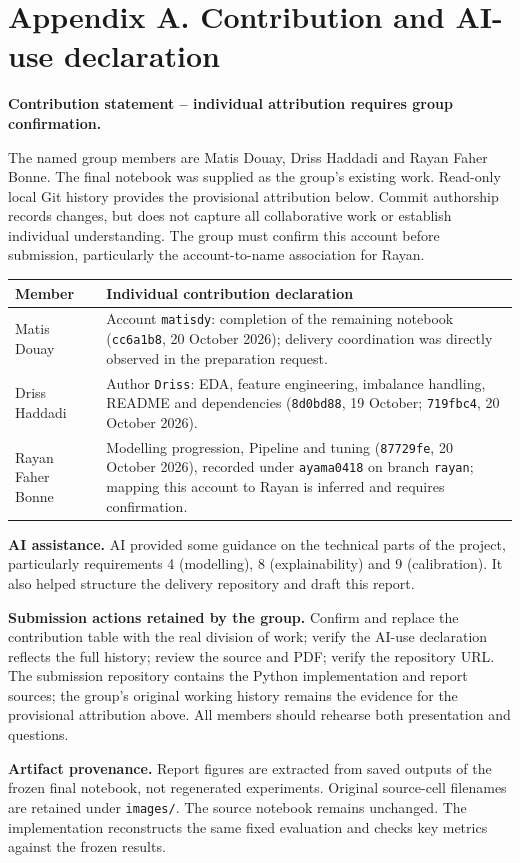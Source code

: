 \documentclass[11pt,a4paper]{article}
\newcommand{\nextpage}{\clearpage}
\begin{document}
\nextpage
\appendix
\section*{Appendix A. Contribution and AI-use declaration}
\textbf{Contribution statement -- individual attribution requires group confirmation.}

The named group members are Matis Douay, Driss Haddadi and Rayan Faher Bonne. The final notebook was supplied as the group's existing work. Read-only local Git history provides the provisional attribution below. Commit authorship records changes, but does not capture all collaborative work or establish individual understanding. The group must confirm this account before submission, particularly the account-to-name association for Rayan.

\begin{center}\begin{tabularx}{\linewidth}{lX}\toprule
Member & Individual contribution declaration\\\midrule
Matis Douay & Account \texttt{matisdy}: completion of the remaining notebook (\texttt{cc6a1b8}, 20 October 2026); delivery coordination was directly observed in the preparation request.\\
Driss Haddadi & Author \texttt{Driss}: EDA, feature engineering, imbalance handling, README and dependencies (\texttt{8d0bd88}, 19 October; \texttt{719fbc4}, 20 October 2026).\\
Rayan Faher Bonne & Modelling progression, Pipeline and tuning (\texttt{87729fe}, 20 October 2026), recorded under \texttt{ayama0418} on branch \texttt{rayan}; mapping this account to Rayan is inferred and requires confirmation.\\\bottomrule
\end{tabularx}\end{center}
\textbf{AI assistance.} AI provided some guidance on the technical parts of the project, particularly requirements 4 (modelling), 8 (explainability) and 9 (calibration). It also helped structure the delivery repository and draft this report.

\textbf{Submission actions retained by the group.} Confirm and replace the contribution table with the real division of work; verify the AI-use declaration reflects the full history; review the source and PDF; verify the repository URL. The submission repository contains the Python implementation and report sources; the group's original working history remains the evidence for the provisional attribution above. All members should rehearse both presentation and questions.

\textbf{Artifact provenance.} Report figures are extracted from saved outputs of the frozen final notebook, not regenerated experiments. Original source-cell filenames are retained under \texttt{images/}. The source notebook remains unchanged. The implementation reconstructs the same fixed evaluation and checks key metrics against the frozen results.
\end{document}
